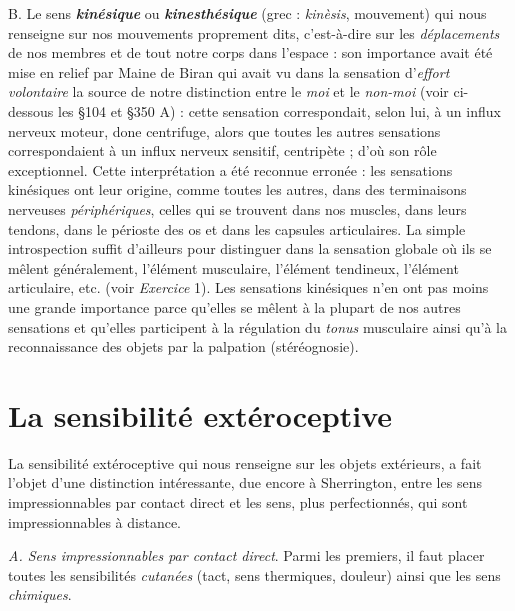 B. Le sens \textbf{\textit {kinésique}} ou \textbf{\textit {kinesthésique}} (grec : {\it kinèsis}, mouvement)
qui nous renseigne sur nos mouvements proprement dits, c’est-à-dire
sur les {\it déplacements} de nos membres et de tout notre corps dans
l’espace : son importance avait été mise en relief par Maine de Biran
qui avait vu dans la sensation d’{\it effort volontaire} la source de notre
distinction entre le {\it moi} et le {\it non-moi} (voir ci-dessous les \S 104 et
\S 350 A) : cette sensation correspondait, selon lui, à un influx nerveux
moteur, done centrifuge, alors que toutes les autres sensations correspondaient
à un influx nerveux sensitif, centripète ; d’où son rôle
exceptionnel. Cette interprétation a été reconnue erronée : les sensations
kinésiques ont leur origine, comme toutes les autres, dans des
terminaisons nerveuses {\it périphériques}, celles qui se trouvent dans nos
muscles, dans leurs tendons, dans le périoste des os et dans les capsules
articulaires. La simple introspection suffit d’ailleurs pour distinguer
dans la sensation globale où ils se mêlent généralement, l’élément
musculaire, l’élément tendineux, l’élément articulaire, etc. (voir
{\it Exercice} 1). Les sensations kinésiques n’en ont pas moins une grande
importance parce qu’elles se mêlent à la plupart de nos autres sensations
et qu’elles participent à la régulation du {\it tonus} musculaire ainsi
qu’à la reconnaissance des objets par la palpation (stéréognosie).

\section{La sensibilité extéroceptive}%
La sensibilité extéroceptive
qui nous renseigne sur les objets extérieurs, a fait l’objet d’une distinction
intéressante, due encore à Sherrington, entre les sens impressionnables
par contact direct et les sens, plus perfectionnés, qui
sont impressionnables à distance.

{\it A. Sens impressionnables par contact direct}. Parmi les premiers, il
faut placer toutes les sensibilités {\it cutanées} (tact, sens thermiques, douleur)
ainsi que les sens {\it chimiques}.

